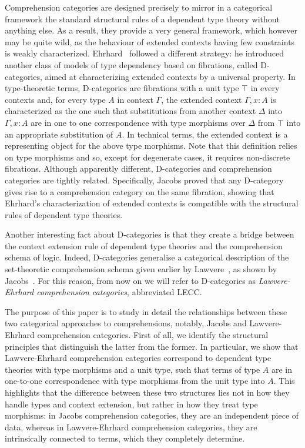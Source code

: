 \documentclass{lmcs} %
\theoremstyle{plain}\newtheorem{satz}[thm]{Satz} %
\begin{document}
Comprehension categories are designed precisely to mirror in a categorical framework the standard structural rules of a dependent type theory without anything else. 
As a result, they provide a very general framework, which however may be quite wild, as the behaviour of extended contexts having few constraints is weakly characterized. 
Ehrhard~\cite{ehrhard1988} followed a different strategy:
he introduced another class of models of type dependency based on fibrations, called D-categories, aimed at characterizing extended contexts by a universal property. 
In type-theoretic terms, D-categories are fibrations with a unit type $\top$ in every contexts and, for every type $A$ in context $\Gamma$, the extended context $\Gamma, x : A$ is characterized as the one such that substitutions from another context $\Delta$ into $\Gamma,x:A$ are in one to one correspondence with  type morphisms over $\Delta$ from $\top$ into an appropriate substitution of $A$. 
In technical terms, the extended context is a representing object for the above type morphisms.
Note that this definition relies on type morphisms and so, except for degenerate cases, it requires non-discrete fibrations. 
% 
Although apparently different, D-categories and comprehension categories are tightly related. 
Specifically, Jacobs \cite{JACOBS1993169} proved that any D-category gives rise to a comprehension category on the same fibration, showing that Ehrhard's characterization of extended contexts is compatible with the structural rules of dependent type theories.

Another interesting fact about D-categories is that they create a bridge between the context extension rule of dependent type theories and the comprehension schema of logic. 
Indeed, D-categories generalise a categorical description of the set-theoretic comprehension schema given earlier by Lawvere~\cite{MR0257175}, as shown by Jacobs~\cite[Example 4.18]{JACOBS1993169}.
For this reason, from now on we will refer to D-categories as \emph{Lawvere-Ehrhard comprehension categories}, abbreviated LECC. 

The purpose of this paper is to study in detail the relationships between these two categorical approaches to comprehensions, notably, Jacobs and Lawvere-Ehrhard comprehension categories. First of all, we identify the structural principles that distinguish the latter from the former. In particular, we show that Lawvere-Ehrhard comprehension categories correspond to dependent type theories with type morphisms and a unit type, such that terms of type $A$ are in one-to-one correspondence with type morphisms from the unit type into $A$. This highlights that the difference between these two structures lies not in how they handle types and context extension, but rather in how they treat type morphisms: in Jacobs comprehension categories, they are an independent piece of data, whereas in Lawvere-Ehrhard comprehension categories, they are intrinsically connected to terms, which they completely determine.
\end{document}
